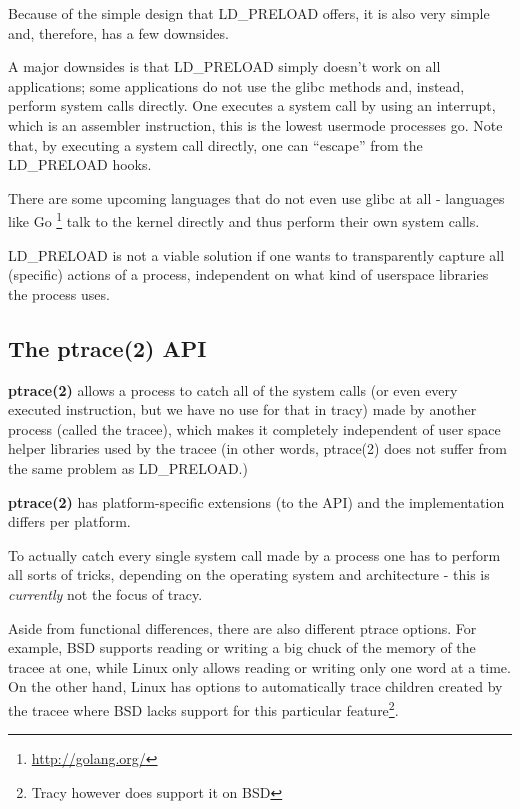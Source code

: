 \documentclass[a4paper, twoside, 10pt, twocolumn]{report}
\begin{document}
Because of the simple design that LD\_PRELOAD offers, it is also very simple
and, therefore, has a few downsides.

A major downsides is that LD\_PRELOAD simply doesn't work on all applications;
some applications do not use the glibc methods and, instead, perform system
calls directly. One executes a system call by using an interrupt, which is an
assembler instruction, this is the lowest usermode processes go. Note that, by
executing a system call directly, one can ``escape'' from the LD\_PRELOAD hooks.

There are some upcoming languages that do not even use glibc at all - languages
like Go \footnote{\url{http://golang.org/}} talk to the kernel directly and
thus perform their own system calls.

LD\_PRELOAD is not a viable solution if one wants to transparently capture all
(specific) actions of a process, independent on what kind of userspace libraries
the process uses.

\subsection{The ptrace(2) API}

\textbf{ptrace(2)} allows a process to catch all of the system calls (or even
every executed instruction, but we have no use for that in tracy)
made by another process (called the tracee), which makes it completely
independent of user space helper libraries used by the tracee (in other words,
ptrace(2) does not suffer from the same problem as LD\_PRELOAD.)

\textbf{ptrace(2)} has platform-specific extensions (to the API) and the
implementation differs per platform.

To actually catch every single system call made by a process one has to
perform all sorts of tricks\cite{}, depending on the operating system and
architecture - this is \textit{currently} not the focus of tracy.

Aside from functional differences, there are also different ptrace options.
For example, BSD supports reading or writing a big chuck of the memory
of the tracee at one, while Linux only allows reading or writing only one
word at a time. On the other hand, Linux has options to automatically trace
children created by the tracee where BSD lacks support for
this particular feature\footnote{Tracy however does support it on BSD}.
\end{document}

